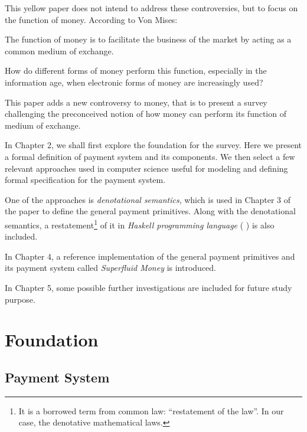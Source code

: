 This yellow paper does not intend to address these controversies, but to focus on the function of
money. According to Von Mises:

\begin{displayquote}
The function of money is to facilitate the business of the market by acting as a common medium of
exchange. 
\end{displayquote}

How do different forms of money perform this function, especially in the information age, when
electronic forms of money are increasingly used?

This paper adds a new controversy to money, that is to present a survey challenging the preconceived
notion of how money can perform its function of medium of exchange.

In Chapter 2, we shall first explore the foundation for the survey. Here we present a formal
definition of payment system and its components. We then select a few relevant approaches used in
computer science useful for modeling and defining formal specification for the payment system.

One of the approaches is \textit{denotational semantics}, which is used in Chapter 3 of the paper to
define the general payment primitives. Along with the denotational semantics, a
restatement\footnote{It is a borrowed term from common law: ``restatement of the law''. In our case,
the denotative mathematical laws.} of it in \textit{Haskell programming language}
(\cite{hudak1992report} \cite{jones2003haskell} \cite{marlow2010haskell}) is also included.

In Chapter 4, a reference implementation of the general payment primitives and its payment system
called
\textit{Superfluid Money} is introduced.

In Chapter 5, some possible further investigations are included for future study purpose.

\chapter{Foundation}

\section{Payment System}

